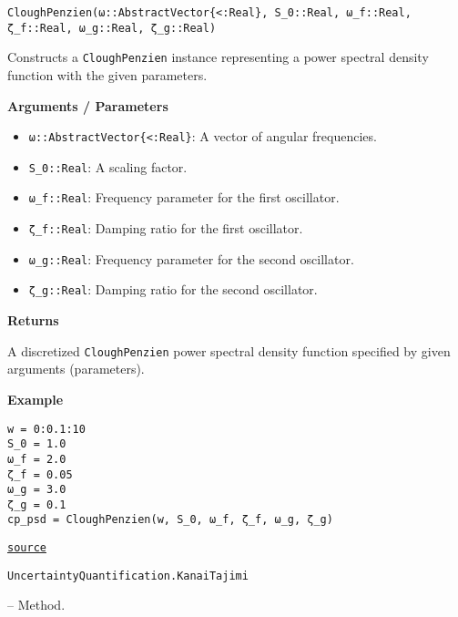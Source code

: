 \begin{adjustwidth}{2em}{0pt}


\begin{verbatim}
CloughPenzien(ω::AbstractVector{<:Real}, S_0::Real, ω_f::Real, ζ_f::Real, ω_g::Real, ζ_g::Real)
\end{verbatim}

Constructs a \texttt{CloughPenzien} instance representing a power spectral density function with the given parameters.

\textbf{Arguments / Parameters}

\begin{itemize}
\item \texttt{ω::AbstractVector\{<:Real\}}: A vector of angular frequencies.


\item \texttt{S\_0::Real}: A scaling factor.


\item \texttt{ω\_f::Real}: Frequency parameter for the first oscillator.


\item \texttt{ζ\_f::Real}: Damping ratio for the first oscillator.


\item \texttt{ω\_g::Real}: Frequency parameter for the second oscillator.


\item \texttt{ζ\_g::Real}: Damping ratio for the second oscillator.

\end{itemize}
\textbf{Returns}

A discretized \texttt{CloughPenzien} power spectral density function specified by given arguments (parameters).

\textbf{Example}


\begin{verbatim}
w = 0:0.1:10
S_0 = 1.0
ω_f = 2.0
ζ_f = 0.05
ω_g = 3.0
ζ_g = 0.1
cp_psd = CloughPenzien(w, S_0, ω_f, ζ_f, ω_g, ζ_g)
\end{verbatim}



\href{https://github.com/friesischscott/UncertaintyQuantification.jl/blob/f5ee6cce729f0d6a57979257379c942cdf42f86f/src/dynamics/psd.jl#L13-L39}{\texttt{source}}


\end{adjustwidth}
\hypertarget{7921530830185962688}{\texttt{UncertaintyQuantification.KanaiTajimi}}  -- {Method.}

